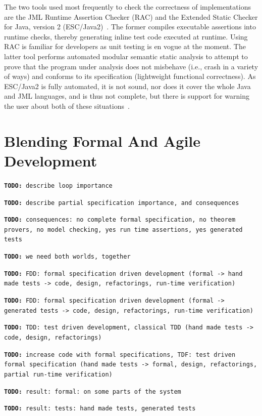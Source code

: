 \documentclass{article} \usepackage{times}
\newcommand{\todo}[1]{\texttt{\textbf{TODO:} #1}}
\begin{document}
The two tools used most frequently to check the correctness of implementations are the JML Runtime Assertion Checker (RAC) and the Extended Static Checker for Java, version 2 (ESC/Java2)~\cite{RAC,ESC}.  The former compiles executable assertions into runtime checks, thereby generating inline test code executed at runtime.  Using RAC is familiar for developers as unit testing is en vogue at the moment.  The latter tool performs automated modular semantic static analysis to attempt to prove that the program under analysis does not misbehave (i.e., crash in a variety of ways) and conforms to its specification (lightweight functional correctness).  As ESC/Java2 is fully automated, it is not sound, nor does it cover the whole Java and JML languages, and is thus not complete, but there is support for warning the user about both of these situations~\cite{soundness,completeness}.

\section{Blending Formal And Agile Development}
\label{sec:blending_formal_and_agile_development}

\todo{describe loop importance}

\todo{describe partial specification importance, and consequences}

\todo{consequences: no complete formal specification, no theorem provers, no model checking, yes run time assertions, yes generated tests}

\todo{we need both worlds, together}

\todo{FDD: formal specification driven development (formal -> hand made tests -> code, design, refactorings, run-time verification)}

\todo{FDD: formal specification driven development (formal -> generated tests -> code, design, refactorings, run-time verification)}

\todo{TDD: test driven development, classical TDD (hand made tests -> code, design, refactorings)}

\todo{increase code with formal specifications, TDF: test driven formal specification (hand made tests -> formal, design, refactorings, partial run-time verification)}

\todo{result: formal: on some parts of the system}

\todo{result: tests: hand made tests, generated tests}
\end{document}
